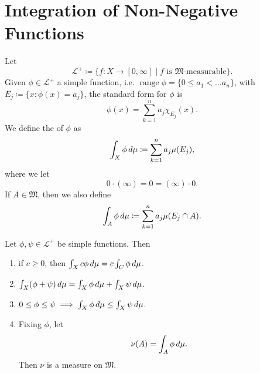 \documentclass[notoc,notitlepage]{tufte-book}
\DeclareMathOperator{\range}{range}
\begin{document}

\section{Integration of Non-Negative Functions}%
\label{sec:integration_of_non_negative_functions}

\begin{defn}\label{defn:integral_of_a_simple_function}
  Let
  \begin{equation*}
    \mathcal{L}^+ \coloneqq \{ f : X \to [0, \infty]
          \mid f \text{ is } \mathfrak{M}\text{-measurable} \}.
  \end{equation*}
  Given $\phi \in \mathcal{L}^+$ a simple function,
  i.e. $\range \phi = \{ 0 \leq a_1 < \hdots a_n \}$,
  with $E_j \coloneqq \{ x : \phi(x) = a_j \}$,
  the standard form for $\phi$ is
  \begin{equation*}
    \phi(x) = \sum_{k=1}^{n} a_j \chi_{E_j}(x).
  \end{equation*}
  We define the  of $\phi$ as
  \begin{equation*}
    \int_{X} \phi \mathop{}\!d{\mu} \coloneqq \sum_{k=1}^{n} a_j \mu(E_j),
  \end{equation*}
  where we let
  \begin{equation*}
    0 \cdot ( \infty ) = 0 = ( \infty ) \cdot 0.
  \end{equation*}
  If $A \in \mathfrak{M}$, then we also define
  \begin{equation*}
    \int_{A} \phi \mathop{}\!d{\mu} \coloneqq \sum_{k=1}^{n} a_j \mu(E_j \cap A).
  \end{equation*}
\end{defn}

\begin{propo}\label{propo:properties_of_integrals_of_simple_functions}
  Let $\phi, \psi \in \mathcal{L}^+$ be simple functions. Then
  \begin{enumerate}
    \item if $c \geq 0$,
      then $\int_{X} c \phi \mathop{}\!d{\mu} = c \int_{C} \phi \mathop{}\!d{\mu}$.
    \item $\int_{X} (\phi + \psi) \mathop{}\!d{\mu}
      = \int_{X} \phi \mathop{}\!d{\mu} + \int_{X} \psi \mathop{}\!d{\mu}$.
    \item $0 \leq \phi \leq \psi \implies
      \int_{X} \phi \mathop{}\!d{\mu} \leq \int_{X} \psi \mathop{}\!d{\mu}$.
    \item Fixing $\phi$, let
      \begin{equation*}
        \nu(A) = \int_{A} \phi \mathop{}\!d{\mu}.
      \end{equation*}
      Then $\nu$ is a measure on $\mathfrak{M}$.
  \end{enumerate}
\end{propo}
\end{document}
